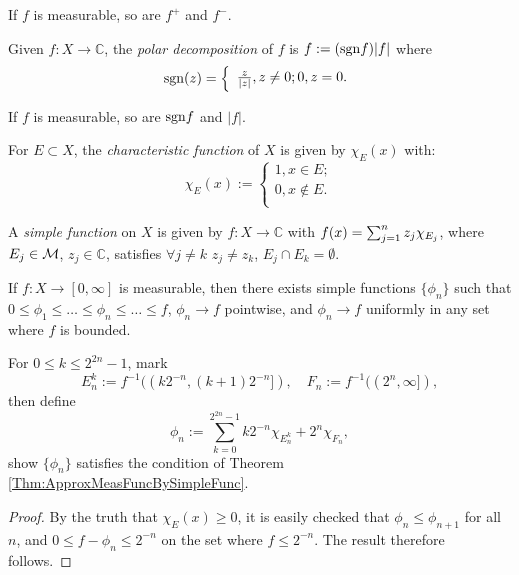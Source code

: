 \begin{rem}
    If $f$ is measurable, so are $f^{+}$ and 
    $f^{-}$.
\end{rem}
\begin{defn}
    Given $f:X\rightarrow\mathbb{C}$, the 
    \textit{polar decomposition }of $f$ is 
    $f:=(\mathrm{sgn} f)|f|$ where 
    \begin{displaymath}
        \mathrm{sgn}(z)=\left\{
            \begin{array}{rl}
                \frac{z}{|z|},z\neq 0;
                0,z=0.
            \end{array}
        \right.
    \end{displaymath}
\end{defn}
\begin{rem}
    If $f$ is measurable, so are $\mathrm{sgn} f$ and $|f|$.
\end{rem}
\begin{defn}
    \label{Defn:CharFunc}
    For $E\subset X$, the \textit{characteristic function} of $X$ 
    is given by $\chi_{E}(x)$ with:
    \begin{displaymath}
        \chi_{E}(x):=\left\{
            \begin{array}{rl}
                1,x\in E;\\
                0,x\notin E.\\
            \end{array}
        \right.
    \end{displaymath}
\end{defn}
\begin{defn}
    \label{Defn:SimpleFunc}
    A \textit{simple function }on $X$ is given by 
    $f:X\rightarrow\mathbb{C}$ with 
    $f(x)=\sum_{j=1}^{n}z_{j}\chi_{E_{j}}$, where $E_j\in\mathcal{M}$, 
    $z_j\in\mathbb{C}$, satisfies $\forall j\neq k$ $z_{j}\neq z_{k}$, 
    $E_j\cap E_k=\emptyset$.
\end{defn}
\begin{thm}
    \label{Thm:ApproxMeasFuncBySimpleFunc}
    If $f:X\rightarrow[0,\infty]$ is measurable, 
    then there exists simple functions $\{\phi_{n}\}$ such that 
    $0\le\phi_{1}\le\ldots\le\phi_{n}\le\ldots\le f$, 
    $\phi_{n}\rightarrow f$ pointwise, and 
    $\phi_{n}\rightarrow f$ uniformly in any set 
    where $f$ is bounded.
\end{thm}
\begin{exc}
    For $0\le k\le 2^{2n}-1$, mark 
    \begin{displaymath}
    E_{n}^{k}:=f^{-1}((k2^{-n},(k+1)2^{-n}]),\quad 
    F_{n}:=f^{-1}((2^{n},\infty]),
    \end{displaymath}
    then define 
    \begin{displaymath}
        \phi_{n}:=\sum_{k=0}^{2^{2n}-1}k2^{-n}\chi_{E_{n}^{k}}
        +2^{n}\chi_{F_{n}},
    \end{displaymath}
    show $\{\phi_{n}\}$ satisfies the condition of 
    Theorem \ref{Thm:ApproxMeasFuncBySimpleFunc}.
\end{exc}
\begin{proof}
    By the truth that $\chi_{E}(x)\geq 0$, it is easily checked
    that $\phi_{n}\leq\phi_{n+1}$ for all $n$, and 
    $0\leq f-\phi_{n}\leq 2^{-n}$ on the set where 
    $f\leq 2^{-n}$. The result therefore follows.
\end{proof}
